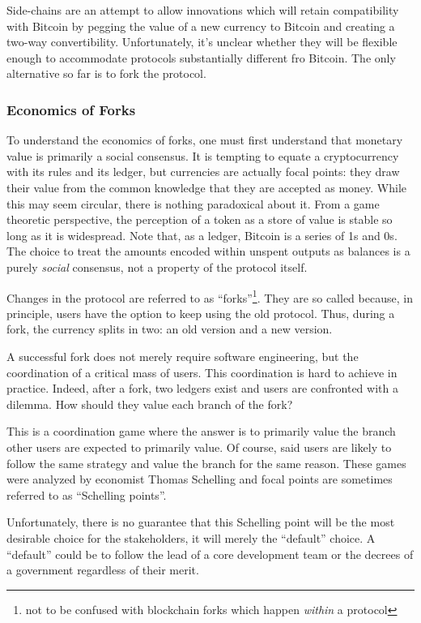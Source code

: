 \documentclass[letterpaper]{article}
\begin{document}
Side-chains are an attempt to allow innovations which will retain
compatibility with Bitcoin by pegging the value of a new currency to Bitcoin and
 creating a two-way convertibility. Unfortunately, it's unclear whether they
will be flexible enough to accommodate protocols substantially different fro
Bitcoin. The only alternative so far is to fork the protocol.

\subsubsection{Economics of Forks}

To understand the economics of forks, one must first understand that monetary
value is primarily a social consensus. It is tempting to equate a
cryptocurrency with its rules and its ledger, but currencies are actually focal
points: they draw their value from the common knowledge that they are accepted
as money. While this may seem circular, there is nothing paradoxical about it.
From a game theoretic perspective, the perception of a token as a store of value
is stable so long as it is widespread. Note that, as a ledger, Bitcoin is
a series of 1s and 0s. The choice to treat the amounts encoded within unspent
outputs as balances is a purely \emph{social} consensus, not a property of the
protocol itself.

Changes in the protocol are referred to as ``forks''\footnote{not to be confused
with blockchain forks which happen \emph{within} a protocol}. They are so called
because, in principle, users have the option to keep using the old protocol.
Thus, during a fork, the currency splits in two: an old version and a new
version.

A successful fork does not merely require software engineering, but
the coordination of a critical mass of users. This coordination is hard
to achieve in practice. Indeed, after a fork, two ledgers exist and users
are confronted with a dilemma. How should they value each branch of the fork?

This is a coordination game where the answer is to primarily value the branch
other users are expected to primarily value. Of course, said users are likely
to follow the same strategy and value the branch for the same reason. These
games were analyzed by economist Thomas Schelling and focal points are
sometimes referred to as ``Schelling points''\cite{schelling}.

Unfortunately, there is no guarantee that this Schelling point will be the most
desirable choice for the stakeholders, it will merely the ``default'' choice.
A ``default'' could be to follow the lead of a core development team or the
decrees of a government regardless of their merit.
\end{document}
